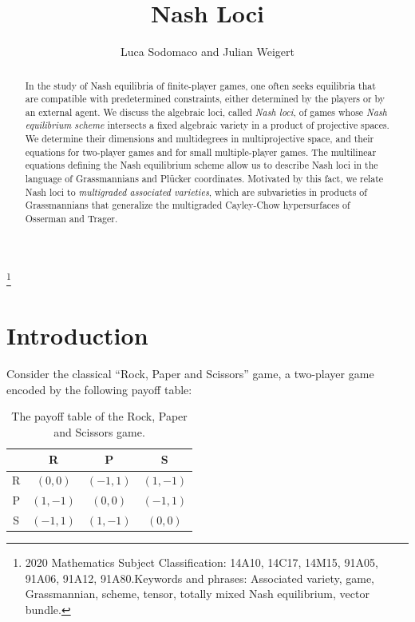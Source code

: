 \documentclass[12pt]{article}
\title{\bf Nash Loci}
\author{Luca Sodomaco and Julian Weigert}
\date{}
\theoremstyle{definition}
\newcommand\blfootnote[1]{%
  \begingroup
  \renewcommand\thefootnote{}\footnote{#1}%
  \addtocounter{footnote}{-1}%
  \endgroup
}
\begin{document}
\maketitle

\begin{abstract}
\noindent In the study of Nash equilibria of finite-player games, one often seeks equilibria that are compatible with predetermined constraints, either determined by the players or by an external agent.
We discuss the algebraic loci, called {\em Nash loci}, of games whose {\em Nash equilibrium scheme} intersects a fixed algebraic variety in a product of projective spaces. We determine their dimensions and multidegrees in multiprojective space, and their equations for two-player games and for small multiple-player games. The multilinear equations defining the Nash equilibrium scheme allow us to describe Nash loci in the language of Grassmannians and Pl\"ucker coordinates. Motivated by this fact, we relate Nash loci to {\em multigraded associated varieties}, which are subvarieties in products of Grassmannians that generalize the multigraded Cayley-Chow hypersurfaces of Osserman and Trager.
\end{abstract}

\blfootnote{{\footnotesize 2020 Mathematics Subject Classification: 14A10, 14C17, 14M15, 91A05, 91A06, 91A12, 91A80.\newline Keywords and phrases: Associated variety, game, Grassmannian, scheme, tensor, totally mixed Nash equilibrium, vector bundle.}}

\section{Introduction}\label{sec: intro}

Consider the classical ``Rock, Paper and Scissors'' game, a two-player game encoded by the following payoff table:
\begin{table}[ht]
    \centering
    \begin{tabular}{c|ccc}
           & R & P & S \\\hline
         R & $(0,0)$ & $(-1,1)$ & $(1,-1)$\\
         P & $(1,-1)$ & $(0,0)$ & $(-1,1)$\\
         S & $(-1,1)$ & $(1,-1)$ & $(0,0)$\\
    \end{tabular}
    \caption{The payoff table of the Rock, Paper and Scissors game.}
    \label{tab: RPS}
\end{table}
\end{document}
